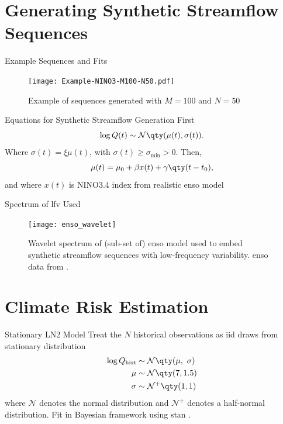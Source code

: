 \documentclass[
  10pt,     %
  handout   %
]{beamer}
\newcommand{\normal}{\mathcal{N}}
\begin{document}
\section{Generating Synthetic Streamflow Sequences}

\begin{frame}{Example Sequences and Fits}
  \begin{figure}
    \texttt{[image: Example-NINO3-M100-N50.pdf]}
    \caption{Example of sequences generated with $M=100$ and $N=50$}
  \end{figure}
\end{frame}

\begin{frame}{Equations for Synthetic Streamflow Generation}
  First
  \begin{equation} \label{eq:lognormal}
    \log Q(t) \sim \normal \qty(\mu(t), \sigma(t)).
  \end{equation}
  Where $\sigma(t) = \xi \mu(t)$, with $\sigma(t) \geq \sigma_\text{min} > 0$.
  Then,
  \begin{equation}\label{eq:nino3}
    \mu(t) = \mu_0 + \beta x(t) + \gamma \qty(t - t_0),
  \end{equation}
  and where $x(t)$ is NINO3.4 index from realistic \gls{enso} model \citep{Zebiak:1987cl,Ramesh:2016hf}
\end{frame}

\begin{frame}{Spectrum of \gls{lfv} Used}
  \begin{figure}
    \texttt{[image: enso\_wavelet]}
    \caption{
      Wavelet spectrum of (sub-set of) \gls{enso} model used to embed synthetic streamflow sequences with low-frequency variability.
      \gls{enso} data from \citet{Ramesh:2016hf}.
    }
  \end{figure}
\end{frame}

\section{Climate Risk Estimation}

\begin{frame}{Stationary LN2 Model}
  Treat the $N$ historical observations as \gls{iid} draws from stationary distribution
  \begin{align}\label{eq:ln2-stationary}
    \begin{split}
      \log Q_\text{hist} & \sim \normal \qty(\mu, \ \sigma) \\
      \mu &\sim \normal \qty(7, 1.5) \\
      \sigma &\sim \normal^+ \qty(1, 1)
    \end{split}
  \end{align}
  where $\normal$ denotes the normal distribution and $\normal^+$ denotes a half-normal distribution.
  Fit in Bayesian framework using stan \citep{Carpenter:2017ke}.
\end{frame}
\end{document}

